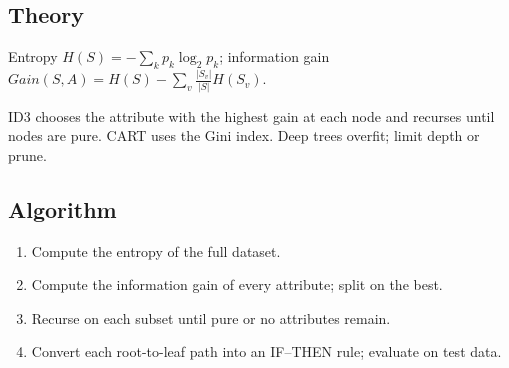 \documentclass[11pt]{article}
\begin{document}
\subsection*{Theory}
Entropy $H(S)=-\sum_k p_k\log_2p_k$; information gain $Gain(S,A)=H(S)-\sum_v\frac{|S_v|}{|S|}H(S_v)$.

ID3 chooses the attribute with the highest gain at each node and recurses until nodes are pure. CART uses the Gini index. Deep trees overfit; limit depth or prune.
\subsection*{Algorithm}
\begin{algo}[Procedure]\begin{enumerate}
\item Compute the entropy of the full dataset.
\item Compute the information gain of every attribute; split on the best.
\item Recurse on each subset until pure or no attributes remain.
\item Convert each root-to-leaf path into an IF--THEN rule; evaluate on test data.
\end{enumerate}\end{algo}
\end{document}
